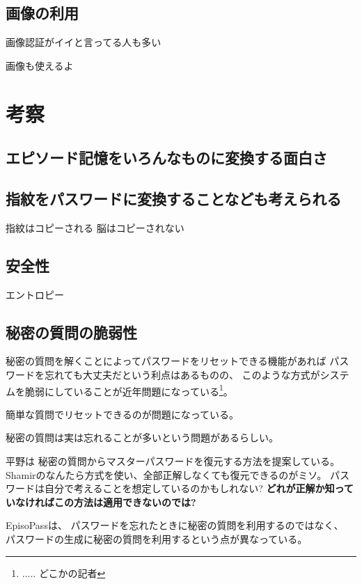 \documentclass[twoside]{wiss}
\begin{document}
\subsection{画像の利用}

画像認証がイイと言ってる人も多い

画像も使えるよ

\section{考察}

\subsection{エピソード記憶をいろんなものに変換する面白さ}

\subsection{指紋をパスワードに変換することなども考えられる}

指紋はコピーされる
脳はコピーされない

\subsection{安全性}

エントロピー

\subsection{秘密の質問の脆弱性}

秘密の質問を解くことによってパスワードをリセットできる機能があれば
パスワードを忘れても大丈夫だという利点はあるものの、
このような方式がシステムを脆弱にしていることが近年問題になっている\footnote{
  ..... どこかの記者
}。

簡単な質問でリセットできるのが問題になっている。

秘密の質問は実は忘れることが多いという問題があるらしい。

平野\cite{平野亮:2011-11-07}は
秘密の質問からマスターパスワードを復元する方法を提案している。
Shamirのなんたら方式を使い、全部正解しなくても復元できるのがミソ。
%
パスワードは自分で考えることを想定しているのかもしれない?
%
\textbf{どれが正解か知っていなければこの方法は適用できないのでは?}

EpisoPassは、
パスワードを忘れたときに秘密の質問を利用するのではなく、
パスワードの生成に秘密の質問を利用するという点が異なっている。
\end{document}
